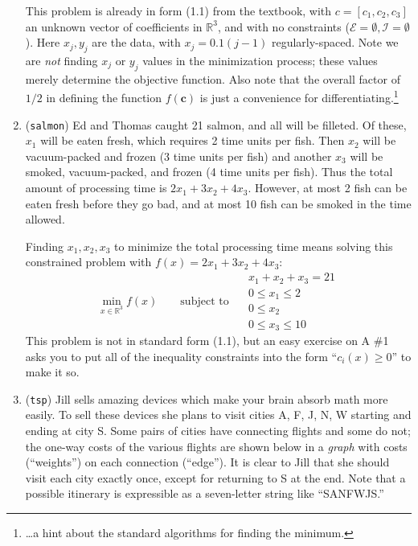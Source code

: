 \documentclass[11pt]{amsart}
\newcommand{\bc}{\mathbf{c}}
\newcommand{\RR}{\mathbb{R}}
\begin{document}
\begin{enumerate}
This problem is already in form (1.1) from the textbook, with $c = \left[c_1,c_2,c_3\right]$ an unknown vector of coefficients in $\RR^3$, and with no constraints ($\mathcal{E}=\emptyset,\mathcal{I}=\emptyset$).  Here $x_j,y_j$ are the data, with $x_j = 0.1 (j-1)$ regularly-spaced.  Note we are \emph{not} finding $x_j$ or $y_j$ values in the minimization process; these values merely determine the objective function.  Also note that the overall factor of $1/2$ in defining the function $f(\bc)$ is just a convenience for differentiating.\footnote{\dots a hint about the standard algorithms for finding the minimum.}

\medskip
\item (\texttt{salmon})  \quad Ed and Thomas caught 21 salmon, and all will be filleted.  Of these, $x_1$ will be eaten fresh, which requires 2 time units per fish.  Then $x_2$ will be vacuum-packed and frozen (3 time units per fish) and another $x_3$ will be smoked, vacuum-packed, and frozen (4 time units per fish).  Thus the total amount of processing time is $2 x_1 + 3 x_2 + 4 x_3$.  However, at most 2 fish can be eaten fresh before they go bad, and at most 10 fish can be smoked in the time allowed.

Finding $x_1,x_2,x_3$ to minimize the total processing time means solving this constrained problem with $f(x) = 2 x_1 + 3 x_2 + 4 x_3$:
	$$\min_{x\in\RR^3} f(x) \qquad \text{subject to }\quad \begin{matrix} x_1 + x_2 + x_3 = 21 \\ 0 \le x_1 \le 2 \\ 0 \le x_2 \\ 0 \le x_3 \le 10 \end{matrix}$$
This problem is not in standard form (1.1), but an easy exercise on A \#1 asks you to put all of the inequality constraints into the form ``$c_i(x) \ge 0$'' to make it so.

\medskip
\item (\texttt{tsp})  \quad Jill sells amazing devices which make your brain absorb math more easily.  To sell these devices she plans to visit cities A, F, J, N, W starting and ending at city S.  Some pairs of cities have connecting flights and some do not; the one-way costs of the various flights are shown below in a \emph{graph} with costs (``weights'') on each connection (``edge'').  It is clear to Jill that she should visit each city exactly once, except for returning to S at the end.  Note that a possible itinerary is expressible as a seven-letter string like ``SANFWJS.''


\end{enumerate}
\end{document}
